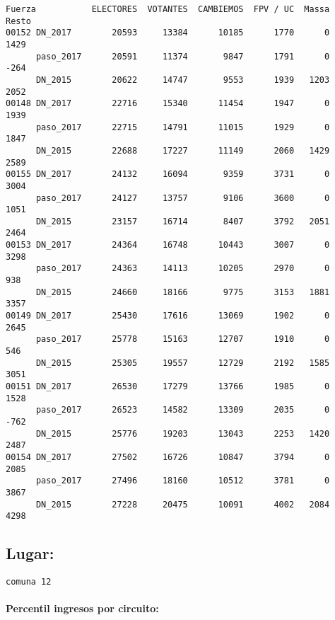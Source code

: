 \documentclass[11pt]{article}
\begin{document}
    \begin{verbatim}
Fuerza           ELECTORES  VOTANTES  CAMBIEMOS  FPV / UC  Massa  Resto
00152 DN_2017        20593     13384      10185      1770      0   1429
      paso_2017      20591     11374       9847      1791      0   -264
      DN_2015        20622     14747       9553      1939   1203   2052
00148 DN_2017        22716     15340      11454      1947      0   1939
      paso_2017      22715     14791      11015      1929      0   1847
      DN_2015        22688     17227      11149      2060   1429   2589
00155 DN_2017        24132     16094       9359      3731      0   3004
      paso_2017      24127     13757       9106      3600      0   1051
      DN_2015        23157     16714       8407      3792   2051   2464
00153 DN_2017        24364     16748      10443      3007      0   3298
      paso_2017      24363     14113      10205      2970      0    938
      DN_2015        24660     18166       9775      3153   1881   3357
00149 DN_2017        25430     17616      13069      1902      0   2645
      paso_2017      25778     15163      12707      1910      0    546
      DN_2015        25305     19557      12729      2192   1585   3051
00151 DN_2017        26530     17279      13766      1985      0   1528
      paso_2017      26523     14582      13309      2035      0   -762
      DN_2015        25776     19203      13043      2253   1420   2487
00154 DN_2017        27502     16726      10847      3794      0   2085
      paso_2017      27496     18160      10512      3781      0   3867
      DN_2015        27228     20475      10091      4002   2084   4298
    \end{verbatim}

    
    \hypertarget{lugar}{%
\subsection{Lugar:}\label{lugar}}

    
    \begin{Verbatim}[commandchars=\\\{\}]
comuna 12

    \end{Verbatim}

    \hypertarget{percentil-ingresos-por-circuito}{%
\paragraph{Percentil ingresos por
circuito:}\label{percentil-ingresos-por-circuito}}
\end{document}
